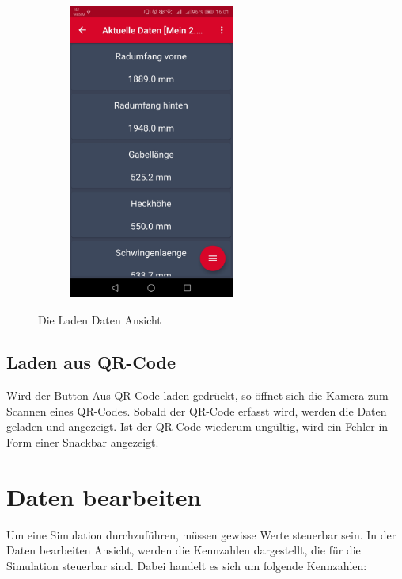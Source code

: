 \begin{figure}[H]
\begin{subfigure}[b]{0.5\textwidth}
		\includegraphics[width=0.6\textwidth]{../include/images/funktionalitaet/dataLaden_withData}
	\end{subfigure}
	\caption{Die Laden Daten Ansicht}
\end{figure}
		\subsection{Laden aus QR-Code}
		\label{subsec:load-qr}
		Wird der Button \glqq Aus QR-Code laden\grqq{} gedrückt, so öffnet sich die Kamera zum Scannen eines QR-Codes. Sobald der QR-Code erfasst wird, werden die Daten geladen und angezeigt. Ist der QR-Code wiederum ungültig, wird ein Fehler in Form einer Snackbar angezeigt.

	\section{Daten bearbeiten}
	
	Um eine Simulation durchzuführen, müssen gewisse Werte steuerbar sein. In der Daten bearbeiten Ansicht, werden die Kennzahlen dargestellt, die für die Simulation steuerbar sind. Dabei handelt es sich um folgende Kennzahlen:
	
